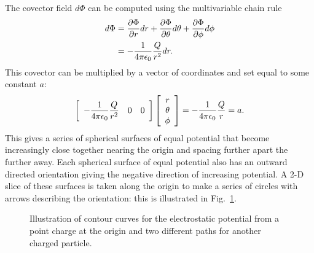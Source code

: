 The covector field $d\Phi$ can be computed using the multivariable chain rule
\begin{align}
  d\Phi &= \frac{ \partial {\Phi} }{ \partial {r} } dr + \frac{ \partial {\Phi} }{ \partial {\theta} } d\theta + \frac{ \partial {\Phi} }{ \partial {\phi} } d\phi \nonumber \\
  &= -\frac{1}{4\pi \epsilon_0} \frac{Q}{r^2} dr .
\end{align}
This covector can be multiplied by a vector of coordinates and set equal to some constant $a$:
\begin{align}
  \left[ \begin{array}{c c c} -\dfrac{1}{4\pi \epsilon_0} \dfrac{Q}{r^2} & 0 & 0 \\ \end{array} \right]
  \left[ \begin{array}{c} r \\ \theta \\ \phi \\ \end{array} \right] = -\dfrac{1}{4\pi \epsilon_0} \dfrac{Q}{r} = a .
\end{align}
This gives a series of spherical surfaces of equal potential that become increasingly close together nearing the origin and spacing further apart the further away. Each spherical surface of equal potential also has an outward directed orientation giving the negative direction of increasing potential. A 2-D slice of these surfaces is taken along the origin to make a series of circles with arrows describing the orientation: this is illustrated in Fig.~\ref{Fig:vector_covectorContoursElectrostaticPotential}.

\begin{figure}[tb!]
\begin{center}
\caption{Illustration of contour curves for the electrostatic potential from a point charge at the origin and two different paths for another charged particle.}
\label{Fig:vector_covectorContoursElectrostaticPotential}
\end{center}
\end{figure}


